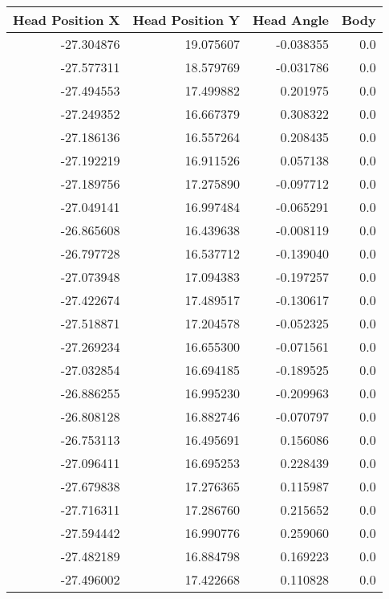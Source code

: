 \begin{tabular}{rrrr}
\toprule
 Head Position X &  Head Position Y &  Head Angle &  Body \\
\midrule
      -27.304876 &        19.075607 &   -0.038355 &   0.0 \\
      -27.577311 &        18.579769 &   -0.031786 &   0.0 \\
      -27.494553 &        17.499882 &    0.201975 &   0.0 \\
      -27.249352 &        16.667379 &    0.308322 &   0.0 \\
      -27.186136 &        16.557264 &    0.208435 &   0.0 \\
      -27.192219 &        16.911526 &    0.057138 &   0.0 \\
      -27.189756 &        17.275890 &   -0.097712 &   0.0 \\
      -27.049141 &        16.997484 &   -0.065291 &   0.0 \\
      -26.865608 &        16.439638 &   -0.008119 &   0.0 \\
      -26.797728 &        16.537712 &   -0.139040 &   0.0 \\
      -27.073948 &        17.094383 &   -0.197257 &   0.0 \\
      -27.422674 &        17.489517 &   -0.130617 &   0.0 \\
      -27.518871 &        17.204578 &   -0.052325 &   0.0 \\
      -27.269234 &        16.655300 &   -0.071561 &   0.0 \\
      -27.032854 &        16.694185 &   -0.189525 &   0.0 \\
      -26.886255 &        16.995230 &   -0.209963 &   0.0 \\
      -26.808128 &        16.882746 &   -0.070797 &   0.0 \\
      -26.753113 &        16.495691 &    0.156086 &   0.0 \\
      -27.096411 &        16.695253 &    0.228439 &   0.0 \\
      -27.679838 &        17.276365 &    0.115987 &   0.0 \\
      -27.716311 &        17.286760 &    0.215652 &   0.0 \\
      -27.594442 &        16.990776 &    0.259060 &   0.0 \\
      -27.482189 &        16.884798 &    0.169223 &   0.0 \\
      -27.496002 &        17.422668 &    0.110828 &   0.0 \\

\end{tabular}
